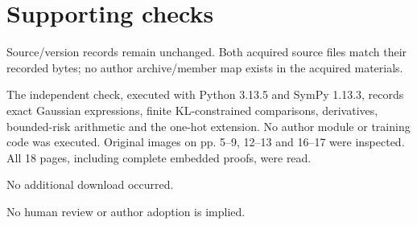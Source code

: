 \documentclass[10pt]{article}
\begin{document}
\section*{Supporting checks}
Source/version records remain unchanged. Both acquired source files match their recorded bytes; no author archive/member map exists in the acquired materials.\par
The independent check, executed with Python 3.13.5 and SymPy 1.13.3, records exact Gaussian expressions, finite KL-constrained comparisons, derivatives, bounded-risk arithmetic and the one-hot extension. No author module or training code was executed. Original images on pp. 5–9, 12–13 and 16–17 were inspected. All 18 pages, including complete embedded proofs, were read.\par
No additional download occurred.\par
No human review or author adoption is implied.\par
\end{document}
